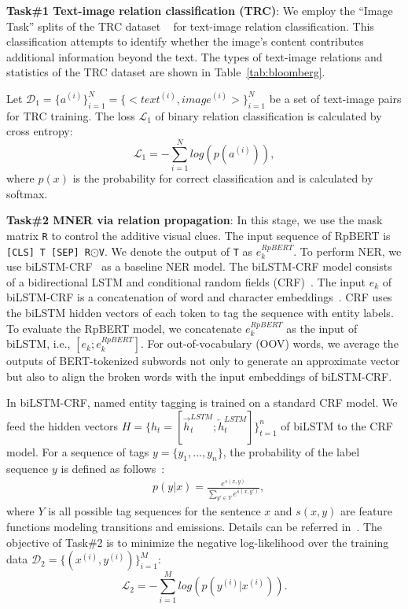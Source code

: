 \documentclass[letterpaper]{article} \usepackage{aaai21}  \usepackage{times}  \usepackage{helvet} \usepackage{courier}  \usepackage[hyphens]{url}  \usepackage{graphicx} \urlstyle{rm} \def\UrlFont{\rm}  \usepackage{natbib}  \usepackage{caption} \frenchspacing  \setlength{\pdfpagewidth}{8.5in}  \setlength{\pdfpageheight}{11in}
\begin{document}
\smallskip
\noindent
\textbf{Task\#1 Text-image relation classification (TRC)}:
We employ the ``Image Task'' splits of the TRC dataset ~\cite{vempala2019categorizing} for text-image relation classification. This classification attempts to identify whether the image’s content contributes additional information beyond the text.
The types of text-image relations and statistics of the TRC dataset are shown in Table~\ref{tab:bloomberg}.







Let $\mathcal D_{1}=\{a^{(i)}\}^{N}_{i=1}=\{<text^{(i)},image^{(i)}>\}^{N}_{i=1}$ be a set of text-image pairs for TRC training. 
The loss $\mathcal L_{1}$ of binary relation classification is calculated by cross entropy:
\begin{equation}
\label{eq:loss1}
\mathcal L_{1} = -\sum^{N}_{i=1} log(p(a^{(i)})),
\end{equation} 
where  $p(x)$ is the probability for correct classification and is calculated by softmax.


\smallskip
\noindent
\textbf{Task\#2  MNER via relation propagation}:
In this stage, we use the mask matrix \texttt{R} to control the additive visual clues.
The input sequence of RpBERT is \texttt{[CLS]}~\texttt{T}~\texttt{[SEP]}~\texttt{R}$\odot$\texttt{V}.
We denote the output of \texttt{T} as $e^{RpBERT}_{k}$.
To perform NER, we use  biLSTM-CRF~\cite{lample2016neural} as a baseline NER model.
The biLSTM-CRF model consists of a bidirectional LSTM and conditional random fields (CRF)~\cite{lafferty2001conditional}.
The  input $e_k$ of biLSTM-CRF is a concatenation of word and character embeddings~\cite{lample2016neural}.
CRF uses the biLSTM hidden vectors of each token to tag the sequence with entity labels.
To evaluate the RpBERT model, we concatenate $e^{RpBERT}_{k}$ as the input of biLSTM, i.e., $[e_k;e^{RpBERT}_{k}]$.
For out-of-vocabulary (OOV) words, we average the outputs of BERT-tokenized subwords not only to generate an approximate vector but also to align the broken words with the input embeddings of biLSTM-CRF.



In biLSTM-CRF, named entity tagging is trained on a standard CRF model.
We feed the hidden vectors $H=\{h_{t}=[\overrightarrow{h}^{LSTM}_{t};\overleftarrow{h}^{LSTM}_{t}]\}^{n}_{t=1}$ of biLSTM to the CRF model.
For a sequence of tags $y= \{y_1,\ldots,y_n\}$, the probability of the label sequence $y$ is defined as follows~\cite{lample2016neural}:
\begin{eqnarray}
\label{eq:CRFprob}
&p(y|x)= \frac{e^{s(x,y)}}{\sum_{y'\in Y} e^{s(x,y')}},
\end{eqnarray}
where $Y$ is all possible tag sequences for the sentence $x$ and $s(x,y)$ are feature functions modeling transitions and emissions.
Details can be referred in~\cite{lample2016neural}.
The objective of Task\#2 is to minimize the negative log-likelihood over the training data $\mathcal D_{2}=\{(x^{(i)},y^{(i)})\}^M_{i=1}$:
\begin{equation}
\label{eq:CRFloss}
\mathcal L_{2} =-\sum^{M}_{i=1} log(p(y^{(i)}|x^{(i)})).
\end{equation} 
\end{document}
